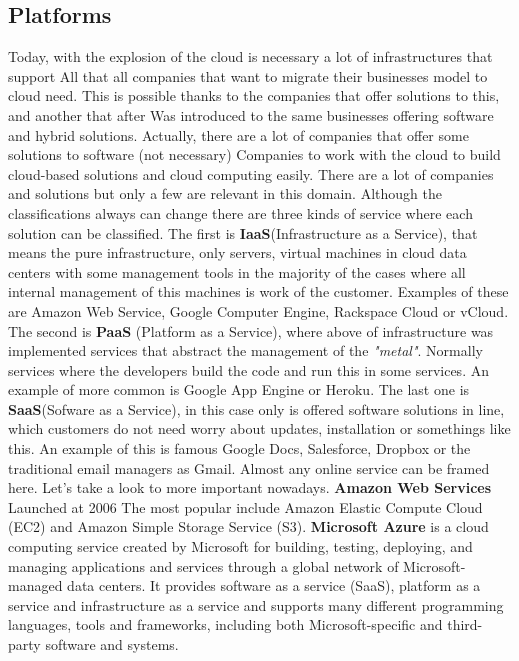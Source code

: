 \subsection{Platforms}

Today, with the explosion of the cloud is necessary a lot of infrastructures that support
All that all companies that want to migrate their businesses model to cloud need.
This is possible thanks to the companies that offer solutions to this, and another that after
Was introduced to the same businesses offering software and hybrid solutions.
Actually, there are a lot of companies that offer some solutions to software (not necessary)
Companies to work with the cloud to build cloud-based solutions and cloud computing easily.
\intro
There are a lot of companies and solutions but only a few are relevant in this domain.
Although the classifications always can change there are three kinds of service
where each solution can be classified.
\intro
The first is \textbf{IaaS}(Infrastructure as a Service), that means the pure
infrastructure, only servers, virtual machines in cloud data centers with some
 management tools in the majority of the cases where all internal management of
 this machines is work of the customer. Examples of these are
Amazon Web Service, Google Computer Engine, Rackspace Cloud or vCloud.
The second is
\intro
\textbf{PaaS} (Platform as a Service), where above of infrastructure was implemented
services that abstract the management of the \textit{"metal"}. Normally services
where the developers build the code and run this in some services. An example of more
common is Google App Engine or Heroku.
\intro
The last one is \textbf{SaaS}(Sofware as a Service), in this case only is offered
software solutions in line, which customers do not need worry about updates,
installation or somethings like this. An example of this is famous Google Docs,
Salesforce, Dropbox or the traditional email managers as Gmail. Almost any online
service can be framed here.
Let's take a look to more important nowadays.
\intro
\textbf{Amazon Web Services}
\intro
Launched at 2006 The most popular include Amazon Elastic
Compute Cloud (EC2) and Amazon Simple Storage Service (S3).
\intro
\textbf{Microsoft Azure}
\intro
is a cloud computing service created by Microsoft for building, testing, deploying,
and managing applications and services through a global network of Microsoft-managed
data centers. It provides software as a service (SaaS), platform as a service and
infrastructure as a service and supports many different programming languages,
tools and frameworks, including both Microsoft-specific and third-party software and systems.
